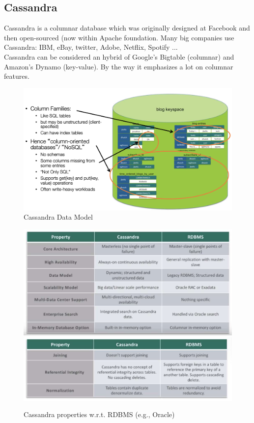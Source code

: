 \documentclass[10pt,a4paper]{article}
\begin{document}
\subsection{Cassandra}
Cassandra is a columnar database which was originally designed at Facebook and then open-sourced (now within Apache foundation. Many big companies use Cassandra: IBM, eBay, twitter, Adobe, Netflix, Spotify ...
\\
Cassandra can be considered an hybrid of Google's Bigtable (columnar) and Amazon's Dynamo (key-value). By the way it emphasizes a lot on columnar features.
\begin{figure}[h!]
 \hfill \includegraphics[width=350pt]{images/cassandra-data-model.png}\hspace*{\fill}
 \caption{Cassandra Data Model}
\end{figure}
\begin{figure}[h!]
 \hfill \includegraphics[width=350pt]{images/cassandra-vs-rdbms.png}\hspace*{\fill} \center
  \hfill \includegraphics[width=350pt]{images/cassandra-vs-rdbms2.png}\hspace*{\fill}
 \caption{Cassandra properties w.r.t. RDBMS (e.g., Oracle)}
\end{figure} \\
\raggedright
\pagebreak
\end{document}
